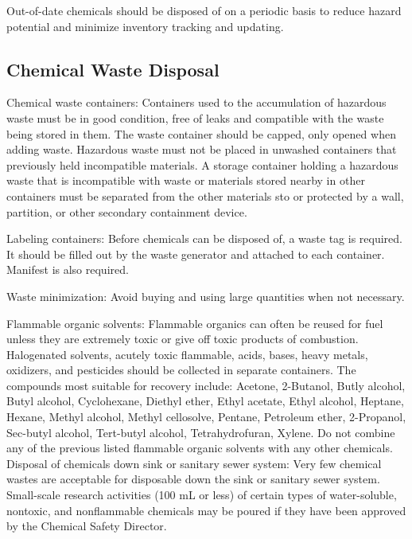 \documentclass[12pt]{../SOP3_beta}\usepackage[]{graphicx}\usepackage[]{color}
\begin{document}
\NP Out-of-date chemicals should be disposed of on a periodic basis to reduce hazard potential and minimize inventory tracking and updating.

\subsection*{Chemical Waste Disposal}

\NP Chemical waste containers: Containers used to the accumulation of hazardous waste must be in good condition, free of leaks and compatible with the waste being stored in them. The waste container should be capped, only opened when adding waste. Hazardous waste must not be placed in unwashed containers that previously held incompatible materials.  A storage container holding a hazardous waste that is incompatible with waste or materials stored nearby in other containers must be separated from the other materials  sto or protected by a wall, partition, or other secondary containment device. 

\NP Labeling containers: Before chemicals can be disposed of, a waste tag is required. It should be filled out by the waste generator and attached to each container. Manifest is also required. 

\NP Waste minimization: Avoid buying and using large quantities when not necessary. 

\NP Flammable organic solvents: Flammable organics can often be reused for fuel unless they are extremely toxic or give off toxic products of combustion. Halogenated solvents, acutely toxic flammable, acids, bases, heavy metals, oxidizers, and pesticides should be collected in separate containers. The compounds most suitable for recovery include: Acetone, 2-Butanol, Butly alcohol, Butyl alcohol, Cyclohexane, Diethyl ether, Ethyl acetate, Ethyl alcohol, Heptane, Hexane, Methyl alcohol, Methyl cellosolve, Pentane, Petroleum ether, 2-Propanol, Sec-butyl alcohol, Tert-butyl alcohol, Tetrahydrofuran, Xylene. Do not combine any of the previous listed flammable organic solvents with any other chemicals. 
Disposal of chemicals down sink or sanitary sewer system:
Very few chemical wastes are acceptable for disposable down the sink or sanitary sewer system. Small-scale research activities (100 mL or less) of certain types of water-soluble, nontoxic, and nonflammable chemicals may be poured if they have been approved by the Chemical Safety Director. 
\end{document}
